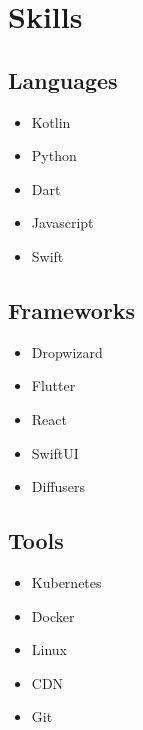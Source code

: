 \documentclass[12pt]{article}
\begin{document}
    \section{Skills}
    {
        \subsection{Languages}
        {
            \begin{multicols}{5}
                \begin{itemize}[nosep, parsep=0.1ex, itemsep=0.1ex]
                    \item Kotlin
                    \item Python
                    \item Dart
                    \item Javascript
                    \item Swift
                \end{itemize}
            \end{multicols}
        }
        \subsection{Frameworks}
        {
            \begin{multicols}{5}
                \begin{itemize}[nosep, parsep=0.1ex, itemsep=0.1ex]
                    \item Dropwizard
                    \item Flutter
                    \item React
                    \item SwiftUI
                    \item Diffusers
                \end{itemize}
            \end{multicols}
        }
        \subsection{Tools}
        {
            \begin{multicols}{5}
                \begin{itemize}[nosep, parsep=0.1ex, itemsep=0.1ex]
                    \item Kubernetes
                    \item Docker
                    \item Linux
                    \item CDN
                    \item Git
                \end{itemize}
            \end{multicols}
        }
    }
\end{document}
